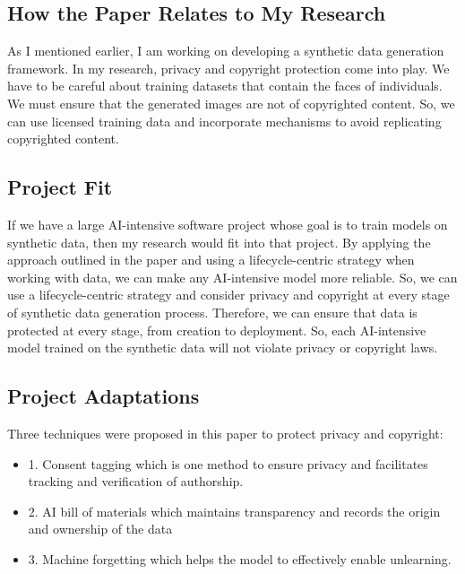 \documentclass[11pt]{article}
\begin{document}
\subsection{How the Paper Relates to My Research} 
 
As I mentioned earlier, I am working on developing a synthetic data generation framework. In my research, privacy and copyright protection come into play. We have to be careful about training datasets that contain the faces of individuals. We must ensure that the generated images are not of copyrighted content. So, we can use licensed training data and incorporate mechanisms to avoid replicating copyrighted content.


\subsection{Project Fit} 
 
If we have a large AI-intensive software project whose goal is to train models on synthetic data, then my research would fit into that project.  By applying the approach outlined in the paper \cite{zhang2024privacy} and using a lifecycle-centric strategy when working with data, we can make any AI-intensive model more reliable. So, we can use a lifecycle-centric strategy and consider privacy and copyright at every stage of synthetic data generation process. Therefore, we can ensure that data is protected at every stage, from creation to deployment. So, each AI-intensive model trained on the synthetic data will not violate privacy or copyright laws.



 \subsection{Project Adaptations} 
  
  
Three techniques were proposed in this paper \cite{zhang2024privacy} to protect privacy and copyright: 

\begin{itemize}

\item {1. Consent tagging which is one method to ensure privacy and facilitates tracking and verification of authorship. }

\item {2. AI bill of materials which maintains transparency and records the origin and ownership of the data}

\item {3. Machine forgetting which helps the model to effectively enable unlearning. }
\end{itemize}
\end{document}
